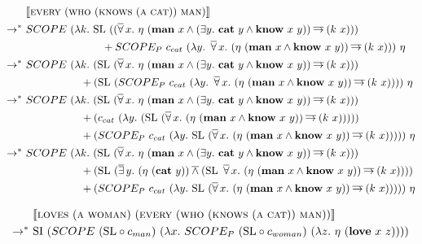 \documentclass{article}
\newcommand{\abs}[1]{\textsc{#1}}
\newcommand{\obj}[1]{\textbf{#1}}
\newcommand{\sem}[1]{\llbracket #1 \rrbracket}
\newcommand{\dand}{\mathbin{\overline{\land}}}
\newcommand{\dimpl}{\mathbin{\overline{\to}}}
\newcommand{\dexists}{\mathop{\overline{\exists}}}
\newcommand{\dforall}{\mathop{\overline{\forall}}}
\begin{document}
\begin{align*}
  & \sem{\abs{every}\ (\abs{who}\ (\abs{knows}\ (\abs{a}\ \abs{cat}))\ \abs{man})} \\
\rightarrow^*\ & SCOPE\ (\lambda k.\ \mathrm{SL}\ ((\dforall x.\
  \eta\ (\obj{man}\ x \land (\exists y.\ \obj{cat}\ y \land
  \obj{know}\ x\ y)) \dimpl (k\ x))) \\
  & \hspace{25mm} + SCOPE_P\ c_{cat}\ (\lambda y.\ \dforall x.\ (\eta\ (\obj{man}\ x
  \land \obj{know}\ x\ y)) \dimpl (k\ x)))\ \eta \\
\rightarrow^*\ & SCOPE\ (\lambda k.\ (\mathrm{SL}\ (\dforall x.\
  \eta\ (\obj{man}\ x \land (\exists y.\ \obj{cat}\ y \land
  \obj{know}\ x\ y)) \dimpl (k\ x))) \\
  & \hspace{18mm} + (\mathrm{SL}\ (SCOPE_P\ c_{cat}\ (\lambda y.\ \dforall
  x.\ (\eta\ (\obj{man}\ x \land \obj{know}\ x\ y)) \dimpl (k\ x))))\ \eta \\
\rightarrow^*\ & SCOPE\ (\lambda k.\ (\mathrm{SL}\ (\dforall x.\
  \eta\ (\obj{man}\ x \land (\exists y.\ \obj{cat}\ y \land
  \obj{know}\ x\ y)) \dimpl (k\ x))) \\
  & \hspace{18mm} + (c_{cat}\ (\lambda y.\ (\mathrm{SL}\ (\dforall
  x.\ (\eta\ (\obj{man}\ x \land \obj{know}\ x\ y)) \dimpl (k\ x))))) \\
  & \hspace{18mm} + (SCOPE_P\ c_{cat}\ (\lambda y.\ \mathrm{SL}\ (\dforall
  x.\ (\eta\ (\obj{man}\ x \land \obj{know}\ x\ y)) \dimpl (k\ x)))))\ \eta \\
\rightarrow^*\ & SCOPE\ (\lambda k.\ (\mathrm{SL}\ (\dforall x.\
  \eta\ (\obj{man}\ x \land (\exists y.\ \obj{cat}\ y \land
  \obj{know}\ x\ y)) \dimpl (k\ x))) \\
  & \hspace{18mm} + (\mathrm{SL}\ (\dexists y.\ (\eta\ (\obj{cat}\ y)) \dand (\mathrm{SL}\ \dforall
  x.\ (\eta\ (\obj{man}\ x \land \obj{know}\ x\ y)) \dimpl (k\ x)))) \\
  & \hspace{18mm} + (SCOPE_P\ c_{cat}\ (\lambda y.\ \mathrm{SL}\ (\dforall
  x.\ (\eta\ (\obj{man}\ x \land \obj{know}\ x\ y)) \dimpl (k\ x)))))\ \eta \\
\end{align*}

\begin{align*}
  & \sem{\abs{loves}\ (\abs{a}\ \abs{woman})\ (\abs{every}\ (\abs{who}\ (\abs{knows}\ (\abs{a}\ \abs{cat}))\ \abs{man}))} \\
  \rightarrow^*\ & \mathrm{SI}\ (SCOPE\ (\mathrm{SL} \circ c_{man})\ 
  (\lambda x.\ SCOPE_P\ (\mathrm{SL} \circ c_{woman})\
  (\lambda z.\ \eta\ (\obj{love}\ x\ z)))) \\
\end{align*}
\end{document}
